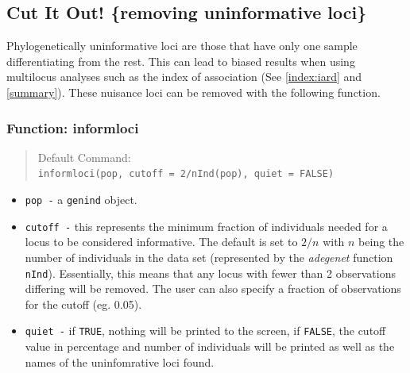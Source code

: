 \documentclass[letterpaper]{article}
\newcommand{\tab}{\hspace*{1em}}
\begin{document}
\subsection{Cut It Out!  \{removing uninformative loci\}}\label{data.manip:informloci}
 \tab\tab Phylogenetically uninformative loci are those that have only one sample differentiating from the rest. This can lead to biased results when using multilocus analyses such as the index of association (See \ref{index:iard} and \ref{summary}). These nuisance loci can be removed with the following function.
\subsubsection{Function: informloci}\label{data.manip:informloci:informloci}
\begin{quote}
Default Command:\\
\texttt{informloci(pop, cutoff = 2/nInd(pop), quiet = FALSE)}
\end{quote}
  \begin{itemize}
    \item \texttt{pop -} a \texttt{genind} object.
    \item \texttt{cutoff -} this represents the minimum fraction of individuals needed for a locus to be considered informative. The default is set to $2/n$ with $n$ being the number of individuals in the data set (represented by the \textit{adegenet} function \texttt{nInd}). Essentially, this means that any locus with fewer than 2 observations differing will be removed. The user can also specify a fraction of observations for the cutoff (eg. 0.05).
    \item \texttt{quiet -} if \texttt{TRUE}, nothing will be printed to the screen, if \texttt{FALSE}, the cutoff value in percentage and number of individuals will be printed as well as the names of the uninfomrative loci found. 
  \end{itemize}
\end{document}

